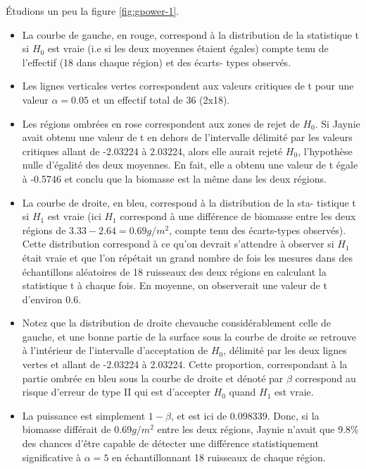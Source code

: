 \documentclass[12pt,]{book}
\providecommand{\tightlist}{%
  \setlength{\itemsep}{0pt}\setlength{\parskip}{0pt}}
\begin{document}
Étudions un peu la figure \ref{fig:gpower-1}.

\begin{itemize}
\tightlist
\item
  La courbe de gauche, en rouge, correspond à la distribution de la statistique t si \(H_0\) est vraie (i.e si les deux moyennes étaient égales) compte tenu de l'effectif (18 dans chaque région) et des écarts- types observés.
\item
  Les lignes verticales vertes correspondent aux valeurs critiques de t pour une valeur \(\alpha = 0.05\) et un effectif total de 36 (2x18).
\item
  Les régions ombrées en rose correspondent aux zones de rejet de \(H_0\).
  Si Jaynie avait obtenu une valeur de t en dehors de l'intervalle délimité par les valeurs critiques allant de -2.03224 à 2.03224, alors elle aurait rejeté \(H_0\), l'hypothèse nulle d'égalité des deux moyennes.
  En fait, elle a obtenu une valeur de t égale à -0.5746 et conclu que la biomasse est la même dans les deux régions.
\item
  La courbe de droite, en bleu, correspond à la distribution de la sta- tistique t si \(H_1\) est vraie (ici \(H_1\) correspond à une différence de biomasse entre les deux régions de \(3.33-2.64=0.69g/m^2\), compte tenu des écarts-types observés).
  Cette distribution correspond à ce qu'on devrait s'attendre à observer si \(H_1\) était vraie et que l'on répétait un grand nombre de fois les mesures dans des échantillons aléatoires de 18 ruisseaux des deux régions en calculant la statistique t à chaque fois.
  En moyenne, on observerait une valeur de t d'environ 0.6.
\item
  Notez que la distribution de droite chevauche considérablement celle de gauche, et une bonne partie de la surface sous la courbe de droite se retrouve à l'intérieur de l'intervalle d'acceptation de \(H_0\), délimité par les deux lignes vertes et allant de -2.03224 à 2.03224.
  Cette proportion, correspondant à la partie ombrée en bleu sous la courbe de droite et dénoté par \(\beta\) correspond au risque d'erreur de type II qui est d'accepter \(H_0\) quand \(H_1\) est vraie.
\item
  La puissance est simplement \(1-\beta\), et est ici de 0.098339.
  Donc, si la biomasse différait de 0.69\(g/m^2\) entre les deux régions, Jaynie n'avait que 9.8\% des chances d'être capable de détecter une différence statistiquement significative à \(\alpha=5%
  \) en échantillonnant 18 ruisseaux de chaque région.
\end{itemize}
\end{document}
